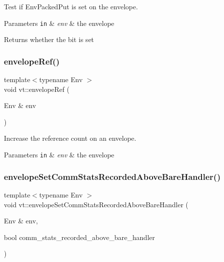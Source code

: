 Test if {\ttfamily Env\+Packed\+Put} is set on the envelope. 


\begin{DoxyParams}[1]{Parameters}
\mbox{\tt in}  & {\em env} & the envelope\\
\hline
\end{DoxyParams}
\begin{DoxyReturn}{Returns}
whether the bit is set 
\end{DoxyReturn}
\mbox{\label{namespacevt_a68c41bd1b8addd0f8feea15a61d5c372}} 
\subsubsection{\texorpdfstring{envelope\+Ref()}{envelopeRef()}}
{\footnotesize\ttfamily template$<$typename Env $>$ \\
void vt\+::envelope\+Ref (\begin{DoxyParamCaption}\item[{Env \&}]{env }\end{DoxyParamCaption})\hspace{0.3cm}{\ttfamily [inline]}}



Increase the reference count on an envelope. 


\begin{DoxyParams}[1]{Parameters}
\mbox{\tt in}  & {\em env} & the envelope \\
\hline
\end{DoxyParams}
\mbox{\label{namespacevt_a959f80af60beb5a12e9b3bce1a80caf8}} 
\subsubsection{\texorpdfstring{envelope\+Set\+Comm\+Stats\+Recorded\+Above\+Bare\+Handler()}{envelopeSetCommStatsRecordedAboveBareHandler()}}
{\footnotesize\ttfamily template$<$typename Env $>$ \\
void vt\+::envelope\+Set\+Comm\+Stats\+Recorded\+Above\+Bare\+Handler (\begin{DoxyParamCaption}\item[{Env \&}]{env,  }\item[{bool}]{comm\+\_\+stats\+\_\+recorded\+\_\+above\+\_\+bare\+\_\+handler }\end{DoxyParamCaption})\hspace{0.3cm}{\ttfamily [inline]}}



